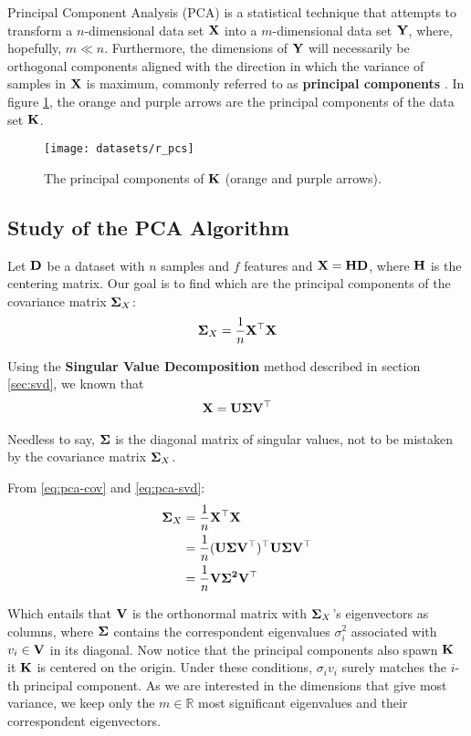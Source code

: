 Principal Component Analysis (PCA) is a statistical technique that attempts to transform a $n$-dimensional data set $\mathbf{X}$ into a $m$-dimensional data set $\mathbf{Y}$, where, hopefully, $m \ll n$. Furthermore, the dimensions of $\mathbf{Y}$ will necessarily be orthogonal components aligned with the direction in which the variance of samples in $\mathbf{X}$ is maximum, commonly referred to as \textbf{principal components} \cite{pca1989}. In figure \ref{fig:datasetrpc}, the orange and purple arrows are the principal components of the data set $\mathbf{K}$.

\begin{figure}[H]
	\centering
	\captionsetup{justification=centering}
	\texttt{[image: datasets/r\_pcs]}
	\caption{The principal components of $\mathbf{K}$ (orange and purple arrows).}
	\label{fig:datasetrpc}
\end{figure}

\subsection{Study of the PCA Algorithm}

Let $\mathbf{D}$ be a dataset with $n$ samples and $f$ features and $\mathbf{X=HD}$, where $\mathbf{H}$ is the centering matrix. Our goal is to find which are the principal components of the covariance matrix $\mathbf{\Sigma}_X$:
\begin{align}
	\label{eq:pca-cov}
	\mathbf{\Sigma}_X=\frac{1}{n} \mathbf{X^\top X}
\end{align}

Using the \textbf{Singular Value Decomposition} method described in section \ref{sec:svd}, we known that
\begin{align}
	\label{eq:pca-svd}
	\mathbf{X = U\Sigma V^\top}
\end{align}

Needless to say, $\mathbf{\Sigma}$ is the diagonal matrix of singular values, not to be mistaken by the covariance matrix $\mathbf{\Sigma}_X$.

From \ref{eq:pca-cov} and \ref{eq:pca-svd}:
\begin{align*}
	\mathbf{\Sigma}_X &= \frac{1}{n} \mathbf{X^\top X} \\
	&= \frac{1}{n} \mathbf{(U\Sigma V^\top)^\top U\Sigma V^\top} \\
	&= \frac{1}{n} \mathbf{V\Sigma^2 V^\top}
\end{align*}

Which entails that $\mathbf{V}$ is the orthonormal matrix with $\mathbf{\Sigma}_X$'s eigenvectors as columns, where $\mathbf{\Sigma}$ contains the correspondent eigenvalues $\sigma_i^2$ associated with $v_i\in \mathbf{V}$ in its diagonal. Now notice that the principal components also spawn $\mathbf{K}$ it $\mathbf{K}$ is centered on the origin. Under these conditions, $\sigma_i v_i$ surely matches the $i$-th principal component. As we are interested in the dimensions that give most variance, we keep only the $m\in\mathbb{R}$ most significant eigenvalues and their correspondent eigenvectors.

